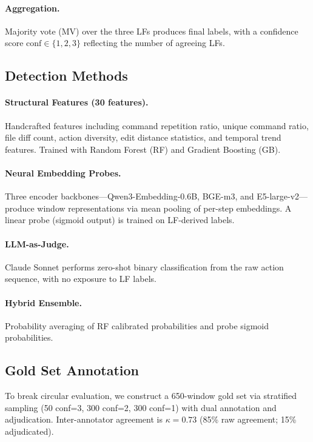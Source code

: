 \documentclass[11pt]{article}
\begin{document}
\paragraph{Aggregation.} Majority vote (MV) over the three LFs produces final labels, with a confidence score $\text{conf} \in \{1, 2, 3\}$ reflecting the number of agreeing LFs.

\subsection{Detection Methods}

\paragraph{Structural Features (30 features).} Handcrafted features including command repetition ratio, unique command ratio, file diff count, action diversity, edit distance statistics, and temporal trend features. Trained with Random Forest (RF) and Gradient Boosting (GB).

\paragraph{Neural Embedding Probes.} Three encoder backbones---Qwen3-Embedding-0.6B, BGE-m3, and E5-large-v2---produce window representations via mean pooling of per-step embeddings. A linear probe (sigmoid output) is trained on LF-derived labels.

\paragraph{LLM-as-Judge.} Claude Sonnet performs zero-shot binary classification from the raw action sequence, with no exposure to LF labels.

\paragraph{Hybrid Ensemble.} Probability averaging of RF calibrated probabilities and probe sigmoid probabilities.

\subsection{Gold Set Annotation}
\label{sec:gold}

To break circular evaluation, we construct a 650-window gold set via stratified sampling (50 conf=3, 300 conf=2, 300 conf=1) with dual annotation and adjudication.
Inter-annotator agreement is $\kappa{=}0.73$ (85\% raw agreement; 15\% adjudicated).
\end{document}
